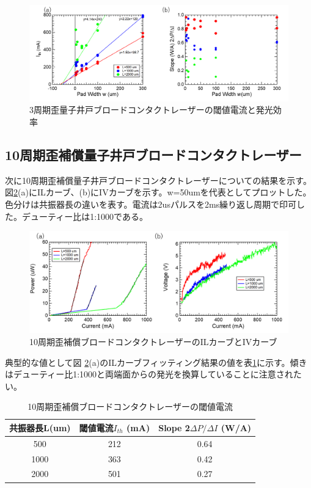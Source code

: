 \begin{figure}[h]
	\centering
	\includegraphics[width=15cm]{figure/fig_3_1_3QW_broadcontact_Ith.png}
		\caption{3周期歪量子井戸ブロードコンタクトレーザーの閾値電流と発光効率}
		\label{fig:fig_3_1_3QW_broadcontact_Ith}
\end{figure}
\clearpage
\subsection{10周期歪補償量子井戸ブロードコンタクトレーザー}%
次に10周期歪補償量子井戸ブロードコンタクトレーザーについての結果を示す。図\ref{fig:fig_3_1_10QW_broadcontact_IL}(a)にILカーブ、(b)にIVカーブを示す。w=50umを代表としてプロットした。色分けは共振器長の違いを表す。電流は2usパルスを2ms繰り返し周期で印可した。デューティー比は1:1000である。
\begin{figure}[h]
	\centering
	\includegraphics[width=15cm]{figure/fig_3_1_10QW_broadcontact_IL.png}
		\caption{10周期歪補償ブロードコンタクトレーザーのILカーブとIVカーブ}
		\label{fig:fig_3_1_10QW_broadcontact_IL}
\end{figure}

典型的な値として図
\ref{fig:fig_3_1_10QW_broadcontact_IL}(a)のILカーブフィッティング結果の値を表\ref{table:table_3_1_10QW_broadcontact}に示す。傾きはデューティー比1:1000と両端面からの発光を換算していることに注意されたい。
\begin{table}[h]
  \caption{10周期歪補償ブロードコンタクトレーザーの閾値電流}
  \label{table:table_3_1_10QW_broadcontact}
  \centering
  \begin{tabular}{ccc}
    \hline
    共振器長L(um)  & 閾値電流$I_{th}$ (mA)  & Slope 2$\Delta P/\Delta I$ (W/A) \\
    \hline \hline
     500& 212&  0.64  \\
    1000& 363& 0.42\\
    2000& 501&0.27\\
       \hline
  \end{tabular}
\end{table}

